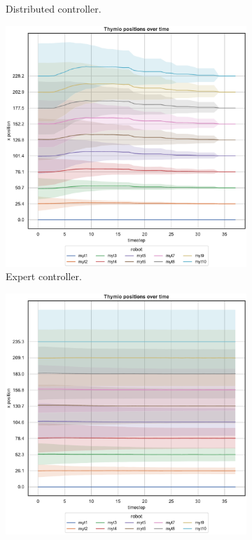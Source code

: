\begin{figure}[!htb]
\begin{center}
\begin{subfigure}[h]{0.325\textwidth}
			\caption{Distributed controller.}
		\end{subfigure}
	\end{center}
	\begin{center}
		\begin{subfigure}[h]{0.325\textwidth}
			\centering
			\includegraphics[width=\textwidth]{contents/images/net-d18/N10/position-overtime-omniscient}%
			\caption{Expert controller.}
		\end{subfigure}
		\hfill
	\begin{subfigure}[h]{0.325\textwidth}
		\centering
		\includegraphics[width=\textwidth]{contents/images/net-d18/N10/position-overtime-manual}%

\end{subfigure}
\end{center}
\end{figure}
